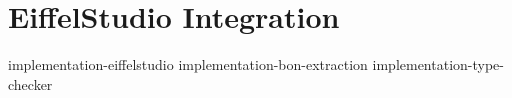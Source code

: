 \chapter{EiffelStudio Integration}
{implementation-eiffelstudio}
{implementation-bon-extraction}
{implementation-type-checker}